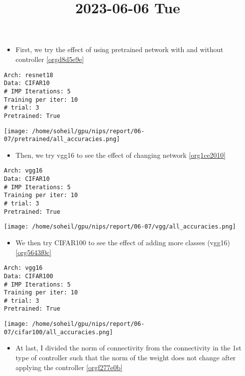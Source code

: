 \documentclass[a4paper]{article}
\date{}
\title{2023-06-06 Tue}
\begin{document}
\maketitle
\begin{itemize}
\item First, we try the effect of using pretrained network with and without
controller \ref{orgd8d5e9e}
\end{itemize}

\begin{verbatim}
Arch: resnet18
Data: CIFAR10
# IMP Iterations: 5
Training per iter: 10
# trial: 3
Pretrained: True
\end{verbatim}

\begin{center}
\texttt{[image: /home/soheil/gpu/nips/report/06-07/pretrained/all\_accuracies.png]}
\label{orgd8d5e9e}
\end{center}

\begin{itemize}
\item Then, we try vgg16 to see the effect of changing network \ref{org1ce2010}
\end{itemize}

\begin{verbatim}
Arch: vgg16
Data: CIFAR10
# IMP Iterations: 5
Training per iter: 10
# trial: 3
Pretrained: True
\end{verbatim}

\begin{center}
\texttt{[image: /home/soheil/gpu/nips/report/06-07/vgg/all\_accuracies.png]}
\label{org1ce2010}
\end{center}

\begin{itemize}
\item We then try CIFAR100 to see the effect of adding more classes (vgg16) \ref{org5643f0c}
\end{itemize}

\begin{verbatim}
Arch: vgg16
Data: CIFAR100
# IMP Iterations: 5
Training per iter: 10
# trial: 3
Pretrained: True
\end{verbatim}

\begin{center}
\texttt{[image: /home/soheil/gpu/nips/report/06-07/cifar100/all\_accuracies.png]}
\label{org5643f0c}
\end{center}

\begin{itemize}
\item At last, I divided the norm of connectivity from the connectivity in the 1st
type of controller such that the norm of the weight does not change after
applying the controller \ref{orgf277e0b}
\end{itemize}
\end{document}
